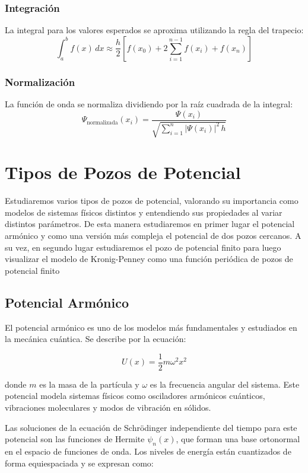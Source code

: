 \documentclass[a4paper,12pt]{article}
\begin{document}
\subsubsection{Integración}
La integral para los valores esperados se aproxima utilizando la regla del trapecio:
\[
\int_a^b f(x) \, dx \approx \frac{h}{2} \left[ f(x_0) + 2 \sum_{i=1}^{n-1} f(x_i) + f(x_n) \right]
\]
\subsubsection{Normalización}
La función de onda se normaliza dividiendo por la raíz cuadrada de la integral:
\[
\Psi_{\text{normalizada}}(x_i) = \frac{\Psi(x_i)}{\sqrt{\sum_{i=1}^{n} |\Psi(x_i)|^2 \, h}}
\]


\section{Tipos de Pozos de Potencial}
Estudiaremos varios tipos de pozos de potencial, valorando su importancia como modelos de sistemas físicos distintos y entendiendo sus propiedades al variar distintos parámetros. De esta manera estudiaremos en primer lugar el potencial armónico y como una versión más compleja el potencial de dos pozos cercanos. A su vez, en segundo lugar estudiaremos el pozo de potencial finito para luego visualizar el modelo de Kronig-Penney como una función periódica de pozos de potencial finito

\subsection{Potencial Armónico}

El potencial armónico es uno de los modelos más fundamentales y estudiados en la mecánica cuántica. Se describe por la ecuación:

\begin{equation}
    U(x) = \frac{1}{2} m \omega^2 x^2
\end{equation}

donde \( m \) es la masa de la partícula y \( \omega \) es la frecuencia angular del sistema. Este potencial modela sistemas físicos como osciladores armónicos cuánticos, vibraciones moleculares y modos de vibración en sólidos.

Las soluciones de la ecuación de Schrödinger independiente del tiempo para este potencial son las funciones de Hermite \( \psi_n(x) \), que forman una base ortonormal en el espacio de funciones de onda. Los niveles de energía están cuantizados de forma equiespaciada y se expresan como:
\end{document}
